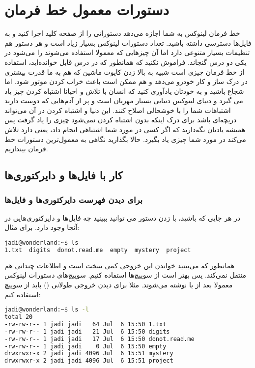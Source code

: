 \section{دستورات معمول خط فرمان}
خط فرمان لینوکس به شما اجازه می‌دهد دستوراتی را از صفحه کلید اجرا کنید و به فایل‌ها دسترسی داشته باشید. تعداد دستورات لینوکس بسیار زیاد است و هر دستور هم تنظیمات بسیار متنوعی دارد اما آن چیزهایی که معمولا استفاده می‌شوند را می‌شود در یکی دو درس گنجاند. فراموش نکنید که همانطور که در درس قابل خوانده‌اید، استفاده از خط فرمان چیزی است شبیه به بالا زدن کاپوت ماشین که هم به ما قدرت بیشتری در درک ساز و کار خودرو می‌دهد و هم ممکن است باعث خراب کردن موتور شود.
اما شجاع باشید و به خودتان یادآوری کنید که انسان با تلاش و احیانا اشتباه کردن چیز یاد می گیرد و دنیای لینوکس دنیایی بسیار مهربان است و پر از آدم‌هایی که دوست دارند اشتباهات شما را با خوشحالی اصلاح کنند. این دنیا و اشتباه کردن در آن می‌تواند دریچه‌ای باشد برای درک اینکه بدون اشتباه کردن نمی‌شود چیزی را یاد گرفت پس همیشه یادتان نگه‌دارید که اگر کسی در مورد شما اشتباهی انجام داد،‌ یعنی دارد تلاش می‌کند در مورد شما چیزی یاد بگیرد.
حالا بگذارید نگاهی به معمول‌ترین دستورات خط فرمان بیندازیم.
\subsection*{کار با فایل‌ها و دایرکتوری‌ها}
\subsubsection*{ برای دیدن فهرست دایرکتوری‌ها و فایل‌ها}
در هر جایی که باشید، با زدن دستور  می توانید ببینید چه فایل‌ها و دایرکتوری‌هایی در آنجا وجود دارد. برای مثال:

\begin{latin}
\begin{lstlisting}[language=bash,basicstyle=\ttfamily,linewidth=12cm]
jadi@wonderland:~$ ls
1.txt  digits  donot.read.me  empty  mystery  project
\end{lstlisting}
\end{latin}

همانطور که می‌بینید خواندن این خروجی کمی سخت است و اطلاعات چندانی هم منتقل نمی‌کند. پس بهتر است از سوییچ‌ها استفاده کنیم. سوییچ‌های دستورات لینوکس معمولا بعد از
\lr{-}
یا
\lr{-{}-}
 نوشته می‌شوند. مثلا برای دیدن خروجی طولانی‌ () باید از سوییچ  استفاده کنم:

\begin{latin}
\begin{lstlisting}[language=bash,basicstyle=\ttfamily,linewidth=12cm]
jadi@wonderland:~$ ls -l
total 20
-rw-rw-r-- 1 jadi jadi   64 Jul  6 15:50 1.txt
-rw-rw-r-- 1 jadi jadi   21 Jul  6 15:50 digits
-rw-rw-r-- 1 jadi jadi   17 Jul  6 15:50 donot.read.me
-rw-rw-r-- 1 jadi jadi    0 Jul  6 15:50 empty
drwxrwxr-x 2 jadi jadi 4096 Jul  6 15:51 mystery
drwxrwxr-x 2 jadi jadi 4096 Jul  6 15:51 project
\end{lstlisting}
\end{latin}

